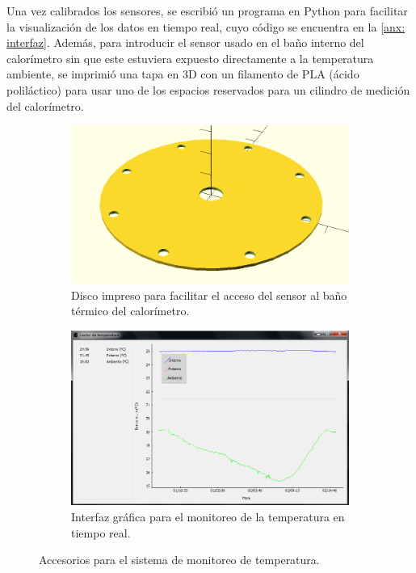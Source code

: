 	\pagebreak

	Una vez calibrados los sensores, se escribió un programa en Python para facilitar la visualización de los datos en tiempo real, cuyo código se encuentra en la \autoref{anx: interfaz}. Además, para introducir el sensor usado en el baño interno del calorímetro sin que este estuviera expuesto directamente a la temperatura ambiente, se imprimió una tapa en 3D con un filamento de PLA (ácido poliláctico) para usar uno de los espacios reservados para un cilindro de medición del calorímetro.
	\begin{figure}[h]
		\centering
		\begin{subfigure}{0.45\linewidth}
			\includegraphics[width=\linewidth]{Figures/PLAdisk}
			\caption{Disco impreso para facilitar el acceso del sensor al baño térmico del calorímetro.}
		\end{subfigure}
		\begin{subfigure}{0.45\linewidth}
			\includegraphics[width=\linewidth]{Figures/temperatureReader}
			\caption{Interfaz gráfica para el monitoreo de la temperatura en tiempo real.}
		\end{subfigure}
		\caption{Accesorios para el sistema de monitoreo de temperatura.}
	\end{figure}

